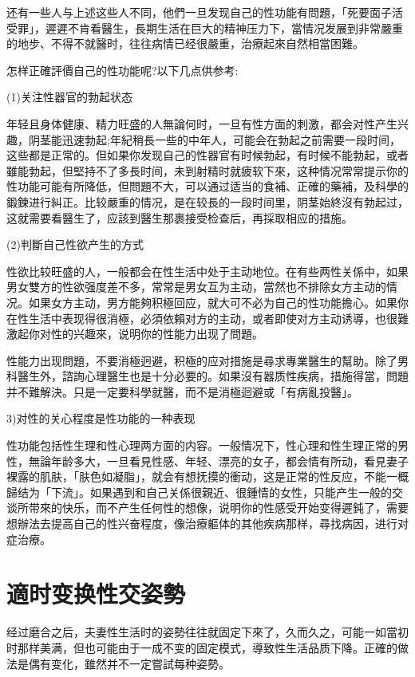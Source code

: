 \documentclass[12pt,UTF8]{ctexbook}
\begin{document}
还有一些人与上述这些人不同，他們一旦发现自己的性功能有問題，「死要面子活受罪」，遲遲不肯看醫生，長期生活在巨大的精神压力下，當情况发展到非常嚴重的地步、不得不就醫时，往往病情已经很嚴重，治療起來自然相當困難。

怎样正確評價自己的性功能呢?以下几点供参考:

(1)关注性器官的勃起状态

年轻且身体健康、精力旺盛的人無論何时，一旦有性方面的刺激，都会对性产生兴趣，阴茎能迅速勃起;年紀稍長一些的中年人，可能会在勃起之前需要一段时间，这些都是正常的。但如果你发现自己的性器官有时候勃起，有时候不能勃起，或者雖能勃起，但堅持不了多長时间，未到射精时就疲软下來，这种情况常常提示你的性功能可能有所降低，但問題不大，可以通过适当的食補、正確的藥補，及科學的鍛鍊进行糾正。比较嚴重的情况，是在较長的一段时间里，阴茎始終沒有勃起过，这就需要看醫生了，应該到醫生那裹接受检查后，再採取相应的措施。

(2)判斷自己性欲产生的方式

性欲比较旺盛的人，一般都会在性生活中处于主动地位。在有些两性关係中，如果男女雙方的性欲强度差不多，常常是男女互为主动，當然也不排除女方主动的情况。如果女方主动，男方能夠积極回应，就大可不必为自己的性功能擔心。如果你在性生活中表现得很消極，必須依賴对方的主动，或者即使对方主动诱導，也很難激起你对性的兴趣來，说明你的性能力出现了問題。

性能力出现問題，不要消極迥避，积極的应对措施是尋求專業醫生的幫助。除了男科醫生外，諮詢心理醫生也是十分必要的。如果沒有器质性疾病，措施得當，問題并不難解決。只是一定要科學就醫，而不是消極迴避或「有病亂投醫」。

3)对性的关心程度是性功能的一种表现

性功能包括性生理和性心理两方面的内容。一般情况下，性心理和性生理正常的男性，無論年龄多大，一旦看見性感、年轻、漂亮的女子，都会情有所动，看見妻子裸露的肌肤，「肤色如凝脂」，就会有想抚摸的衝动，这是正常的性反应，不能一概歸结为「下流」。如果遇到和自己关係很親近、很鍾情的女性，只能产生一般的交谈所带來的快乐，而不产生任何性的想像，说明你的性感受开始变得遲鈍了，需要想辦法去提高自己的性兴奋程度，像治療軀体的其他疾病那样，尋找病因，进行对症治療。

\section{適时变换性交姿勢}

经过磨合之后，夫妻性生活时的姿勢往往就固定下來了，久而久之，可能一如當初时那样美满，但也可能由于一成不变的固定模式，導致性生活品质下降。正確的做法是偶有变化，雖然并不一定嘗試每种姿勢。
\end{document}
